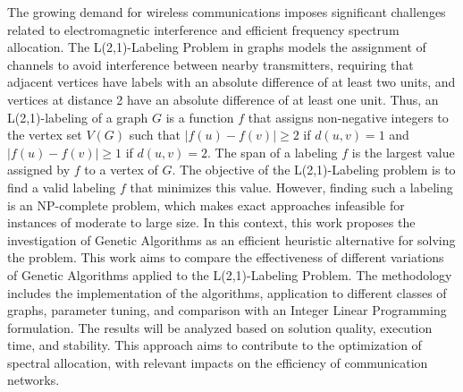 The growing demand for wireless communications imposes significant challenges related to electromagnetic interference and efficient frequency spectrum allocation. The L(2,1)-Labeling Problem in graphs models the assignment of channels to avoid interference between nearby transmitters, requiring that adjacent vertices have labels with an absolute difference of at least two units, and vertices at distance 2 have an absolute difference of at least one unit. Thus, an L(2,1)-labeling of a graph $G$ is a function $f$ that assigns non-negative integers to the vertex set $V(G)$ such that $|f(u) - f(v)| \geq 2$ if $d(u, v) = 1$ and $|f(u) - f(v)| \geq 1$ if $d(u, v) = 2$. The span of a labeling $f$ is the largest value assigned by $f$ to a vertex of $G$. The objective of the L(2,1)-Labeling problem is to find a valid labeling $f$ that minimizes this value. However, finding such a labeling is an NP-complete problem, which makes exact approaches infeasible for instances of moderate to large size. In this context, this work proposes the investigation of Genetic Algorithms as an efficient heuristic alternative for solving the problem. This work aims to compare the effectiveness of different variations of Genetic Algorithms applied to the L(2,1)-Labeling Problem. The methodology includes the implementation of the algorithms, application to different classes of graphs, parameter tuning, and comparison with an Integer Linear Programming formulation. The results will be analyzed based on solution quality, execution time, and stability. This approach aims to contribute to the optimization of spectral allocation, with relevant impacts on the efficiency of communication networks.

